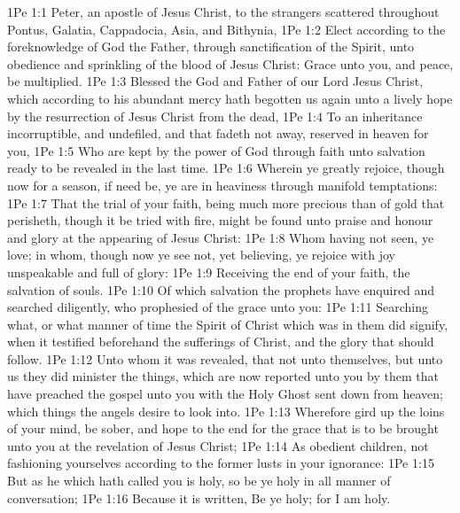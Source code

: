 \vs 1Pe 1:1 Peter, an apostle of Jesus Christ, to the strangers scattered throughout Pontus, Galatia, Cappadocia, Asia, and Bithynia,
\vs 1Pe 1:2 Elect according to the foreknowledge of God the Father, through sanctification of the Spirit, unto obedience and sprinkling of the blood of Jesus Christ: Grace unto you, and peace, be multiplied.
\vs 1Pe 1:3 Blessed  the God and Father of our Lord Jesus Christ, which according to his abundant mercy hath begotten us again unto a lively hope by the resurrection of Jesus Christ from the dead,
\vs 1Pe 1:4 To an inheritance incorruptible, and undefiled, and that fadeth not away, reserved in heaven for you,
\vs 1Pe 1:5 Who are kept by the power of God through faith unto salvation ready to be revealed in the last time.
\vs 1Pe 1:6 Wherein ye greatly rejoice, though now for a season, if need be, ye are in heaviness through manifold temptations:
\vs 1Pe 1:7 That the trial of your faith, being much more precious than of gold that perisheth, though it be tried with fire, might be found unto praise and honour and glory at the appearing of Jesus Christ:
\vs 1Pe 1:8 Whom having not seen, ye love; in whom, though now ye see  not, yet believing, ye rejoice with joy unspeakable and full of glory:
\vs 1Pe 1:9 Receiving the end of your faith,  the salvation of  souls.
\vs 1Pe 1:10 Of which salvation the prophets have enquired and searched diligently, who prophesied of the grace  unto you:
\vs 1Pe 1:11 Searching what, or what manner of time the Spirit of Christ which was in them did signify, when it testified beforehand the sufferings of Christ, and the glory that should follow.
\vs 1Pe 1:12 Unto whom it was revealed, that not unto themselves, but unto us they did minister the things, which are now reported unto you by them that have preached the gospel unto you with the Holy Ghost sent down from heaven; which things the angels desire to look into.
\vs 1Pe 1:13 Wherefore gird up the loins of your mind, be sober, and hope to the end for the grace that is to be brought unto you at the revelation of Jesus Christ;
\vs 1Pe 1:14 As obedient children, not fashioning yourselves according to the former lusts in your ignorance:
\vs 1Pe 1:15 But as he which hath called you is holy, so be ye holy in all manner of conversation;
\vs 1Pe 1:16 Because it is written, Be ye holy; for I am holy.
